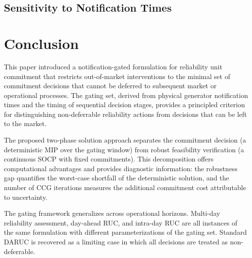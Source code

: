 \documentclass[journal]{IEEEtran}
\begin{document}
\subsection{Sensitivity to Notification Times}
\label{sec:results_sensitivity}



\section{Conclusion}\label{sec:conclusion}

This paper introduced a notification-gated formulation for
reliability unit commitment that restricts out-of-market interventions
to the minimal set of commitment decisions that cannot be deferred to
subsequent market or operational processes.
The gating set, derived from physical generator notification times and
the timing of sequential decision stages, provides a principled
criterion for distinguishing non-deferrable reliability actions from
decisions that can be left to the market.

The proposed two-phase solution approach separates the commitment
decision (a deterministic MIP over the gating window) from robust
feasibility verification (a continuous SOCP with fixed commitments).
This decomposition offers computational advantages and provides
diagnostic information: the robustness gap quantifies the worst-case
shortfall of the deterministic solution, and the number of CCG
iterations measures the additional commitment cost attributable to
uncertainty.

The gating framework generalizes across operational horizons.
Multi-day reliability assessment, day-ahead RUC, and intra-day RUC
are all instances of the same formulation with different
parameterizations of the gating set.
Standard DARUC is recovered as a limiting case in which all decisions
are treated as non-deferrable.
\end{document}
